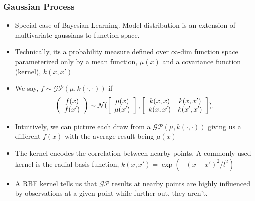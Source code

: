 \documentclass[9pt, aspectratio=169]{beamer}
\begin{document}
\begin{frame}
  \frametitle{Gaussian Process}
  \begin{itemize}
    \item Special case of Bayesian Learning. Model distribution is an extension of multivariate gaussians to function space.
    \item Technically, its a probability measure defined over $\infty$-dim function space parameterized only by a mean function, $\mu(x)$ and a covariance function (kernel), $k(x, x')$
    \item We say, $f\sim\mathcal{GP}(\mu,k(\cdot,\cdot))$ if 
      \begin{equation*}
        \left(\begin{array}{c} f(x) \\ f(x') \end{array}\right)\sim\mathcal{N}(\left[\begin{array}{c} \mu(x) \\ \mu(x') \end{array}\right], \left[\begin{array}{c c} k(x,x) & k(x,x') \\ k(x,x') & k(x',x') \end{array}\right]).
      \end{equation*}
    \item Intuitively, we can picture each draw from a $\mathcal{GP}(\mu,k(\cdot,\cdot))$ giving us a different $f(x)$ with the average result being $\mu(x)$
    \item The kernel encodes the correlation between nearby points. A commonly used kernel is the radial basis function, $k(x,x')=\exp(-(x-x')^2/l^2)$
    \item A RBF kernel tells us that $\mathcal{GP}$ results at nearby points are highly influenced by observations at a given point while further out, they aren't. 
  \end{itemize}
\end{frame}
\end{document}
